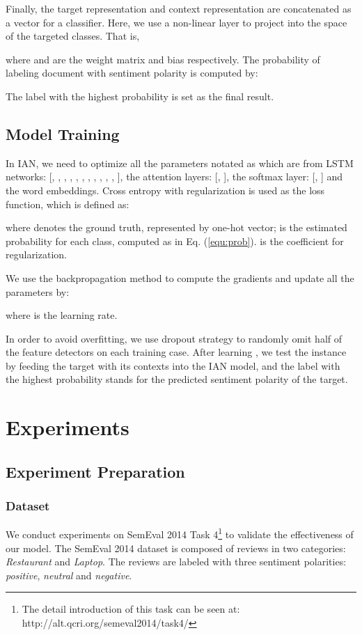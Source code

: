 \documentclass{article}
\begin{document}
Finally, the target representation  and context representation  are concatenated as a vector  for a classifier. Here, we use a non-linear layer to project  into the space of the targeted  classes. That is,

where  and  are the weight matrix and bias respectively.
The probability of labeling document with sentiment polarity  is computed by:


The label with the highest probability is set as the final result.

\subsection{Model Training}
In IAN, we need to optimize all the parameters notated as  which are from LSTM networks: [, , , , , , , , , , , ], the attention layers: [, ], the softmax layer: [, ] and the word embeddings.
Cross entropy with  regularization is used as the loss function, which is defined as:

where  denotes the ground truth, represented by one-hot vector;  is the estimated probability for each class, computed as in Eq. (\ref{equ:prob}).  is the coefficient for  regularization.

We use the backpropagation method to compute the gradients and update all the parameters  by:

where  is the learning rate.

In order to avoid overfitting, we use dropout strategy to randomly omit half of the feature detectors on each training case. 
After learning  , we test the instance by feeding the target with its contexts into the IAN model, and the label with the highest probability stands for the predicted sentiment polarity of the target. 

\section{Experiments} 
\subsection{Experiment Preparation}
\subsubsection*{Dataset} 
We conduct experiments on SemEval 2014 Task 4\footnote{The detail introduction of this task can be seen at: http://alt.qcri.org/semeval2014/task4/} to validate the effectiveness of our model. 
The  SemEval 2014  dataset is composed of reviews in two categories: \emph{Restaurant} and \emph{Laptop}.
The reviews are labeled with three sentiment polarities: \emph{positive}, \emph{neutral} and \emph{negative}. 
\end{document}
